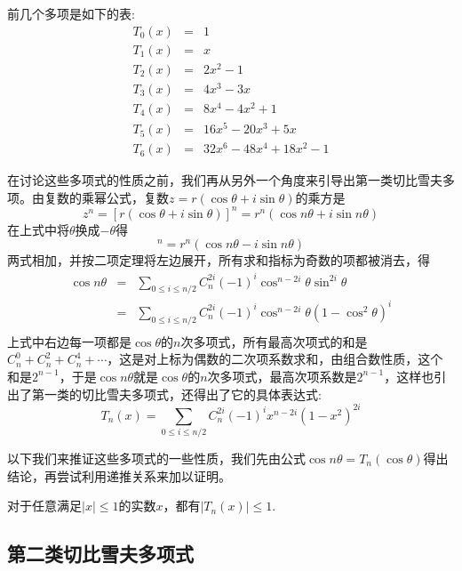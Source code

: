 前几个多项是如下的表:
\begin{eqnarray*}
  T_0(x) & = & 1 \\
  T_1(x) & = & x \\
  T_2(x) & = & 2x^2-1 \\
  T_3(x) & = & 4x^3-3x \\
  T_4(x) & = & 8x^4-4x^2+1 \\
  T_5(x) & = & 16x^5-20x^3+5x \\
  T_6(x) & = & 32x^6-48x^4+18x^2-1
\end{eqnarray*}

在讨论这些多项式的性质之前，我们再从另外一个角度来引导出第一类切比雪夫多项。由复数的乘幂公式，复数$z=r(\cos{\theta}+i\sin{\theta})$的乘方是
\begin{equation*}
  z^n=[r(\cos{\theta}+i\sin{\theta})]^n = r^n(\cos{n\theta}+i\sin{n\theta})
\end{equation*}
在上式中将$\theta$换成$-\theta$得
\begin{equation*}
  [r(\cos{\theta}-i\sin{\theta})]^n = r^n(\cos{n\theta}-i\sin{n\theta})
\end{equation*}
两式相加，并按二项定理将左边展开，所有求和指标为奇数的项都被消去，得
\begin{eqnarray*}
  \cos{n\theta} & = & \sum_{0 \leqslant i \leqslant n/2}C_n^{2i}(-1)^i\cos^{n-2i}{\theta}\sin^{2i}{\theta} \\
  & = & \sum_{0 \leqslant i \leqslant n/2}C_n^{2i}(-1)^i\cos^{n-2i}{\theta}(1-\cos^2{\theta})^i \\
\end{eqnarray*}
上式中右边每一项都是$\cos{\theta}$的$n$次多项式，所有最高次项式的和是$C_n^0+C_n^2+C_n^4+\cdots$，这是对上标为偶数的二次项系数求和，由组合数性质，这个和是$2^{n-1}$，于是$\cos{n\theta}$就是$\cos{\theta}$的$n$次多项式，最高次项系数是$2^{n-1}$，这样也引出了第一类的切比雪夫多项式，还得出了它的具体表达式:
\begin{equation*}
  T_n(x) = \sum_{0 \leqslant i \leqslant n/2}C_n^{2i}(-1)^ix^{n-2i}(1-x^2)^{2i}
\end{equation*}

以下我们来推证这些多项式的一些性质，我们先由公式$\cos{n\theta}=T_n(\cos{\theta})$得出结论，再尝试利用递推关系来加以证明。

\begin{property}
  对于任意满足$|x|\leqslant 1$的实数$x$，都有$|T_n(x)| \leqslant 1$.
\end{property}



\subsection{第二类切比雪夫多项式}
\label{sec:second-chebyshev-polynome}

